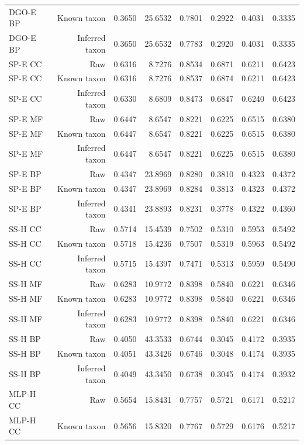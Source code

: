 \begin{longtable}{lrrrrrrr}
DGO-E BP & Known taxon & 0.3650 & 25.6532 & 0.7801 & 0.2922 & 0.4031 & 0.3335 \\
DGO-E BP & Inferred taxon & 0.3650 & 25.6532 & 0.7783 & 0.2920 & 0.4031 & 0.3335 \\
SP-E CC & Raw & 0.6316 & 8.7276 & 0.8534 & 0.6871 & 0.6211 & 0.6423 \\
SP-E CC & Known taxon & 0.6316 & 8.7276 & 0.8537 & 0.6874 & 0.6211 & 0.6423 \\
SP-E CC & Inferred taxon & 0.6330 & 8.6809 & 0.8473 & 0.6847 & 0.6240 & 0.6423 \\
SP-E MF & Raw & 0.6447 & 8.6547 & 0.8221 & 0.6225 & 0.6515 & 0.6380 \\
SP-E MF & Known taxon & 0.6447 & 8.6547 & 0.8221 & 0.6225 & 0.6515 & 0.6380 \\
SP-E MF & Inferred taxon & 0.6447 & 8.6547 & 0.8221 & 0.6225 & 0.6515 & 0.6380 \\
SP-E BP & Raw & 0.4347 & 23.8969 & 0.8280 & 0.3810 & 0.4323 & 0.4372 \\
SP-E BP & Known taxon & 0.4347 & 23.8969 & 0.8284 & 0.3813 & 0.4323 & 0.4372 \\
SP-E BP & Inferred taxon & 0.4341 & 23.8893 & 0.8231 & 0.3778 & 0.4322 & 0.4360 \\
SS-H CC & Raw & 0.5714 & 15.4539 & 0.7502 & 0.5310 & 0.5953 & 0.5492 \\
SS-H CC & Known taxon & 0.5718 & 15.4236 & 0.7507 & 0.5319 & 0.5963 & 0.5492 \\
SS-H CC & Inferred taxon & 0.5715 & 15.4397 & 0.7471 & 0.5313 & 0.5959 & 0.5490 \\
SS-H MF & Raw & 0.6283 & 10.9772 & 0.8398 & 0.5840 & 0.6221 & 0.6346 \\
SS-H MF & Known taxon & 0.6283 & 10.9772 & 0.8398 & 0.5840 & 0.6221 & 0.6346 \\
SS-H MF & Inferred taxon & 0.6283 & 10.9772 & 0.8398 & 0.5840 & 0.6221 & 0.6346 \\
SS-H BP & Raw & 0.4050 & 43.3533 & 0.6744 & 0.3045 & 0.4172 & 0.3935 \\
SS-H BP & Known taxon & 0.4051 & 43.3426 & 0.6746 & 0.3048 & 0.4174 & 0.3935 \\
SS-H BP & Inferred taxon & 0.4049 & 43.3450 & 0.6738 & 0.3045 & 0.4174 & 0.3932 \\
MLP-H CC & Raw & 0.5654 & 15.8431 & 0.7757 & 0.5721 & 0.6171 & 0.5217 \\
MLP-H CC & Known taxon & 0.5656 & 15.8320 & 0.7767 & 0.5729 & 0.6176 & 0.5217 \\

\end{longtable}
